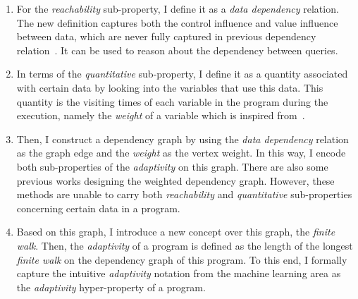 \begin{enumerate}
 \item For the \emph{reachability} sub-property, I define it as a \emph{data dependency} relation.
 The new definition captures both the control influence and value influence between data, which are never fully captured in previous dependency relation~\cite{Cousot19a, ZanioliC11, CheneyAA11}.
 It can be used to reason about the dependency between queries.

 \item In terms of the \emph{quantitative}
 sub-property, 
 I define it as 
 a quantity associated with certain data by looking into the variables that use this data.
 This quantity is the visiting times of each variable in the program during the execution, namely the \emph{weight} of a variable
which is inspired from~\cite{GulwaniJK09}.
 
 \item Then, I construct a dependency graph by using the
 \emph{data dependency} relation as the graph edge and the \emph{weight} as the vertex weight.
 In this way, I encode both 
sub-properties of the \emph{adaptivity} on this graph.
There are also some previous works designing the weighted dependency graph. However, these methods are unable to carry both \emph{reachability} and \emph{quantitative} sub-properties concerning certain data in a program.
 
 \item Based on this graph, I introduce a new concept over this graph, the \emph{finite walk}.
 Then, the \emph{adaptivity} of a program is defined as the length of the longest \emph{finite walk} on the dependency graph of this program.
 To this end, I formally capture the intuitive \emph{adaptivity} notation from
 the machine learning area as the \emph{adaptivity} hyper-property of a program.
 \end{enumerate}


